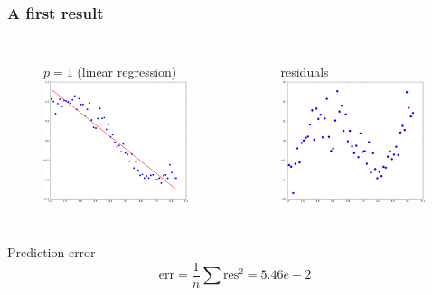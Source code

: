 \documentclass[handout, 10pt]{beamer}
\begin{document}
\begin{frame}
\frametitle{A first result}
\vspace{-2em}
\begin{columns}[t]
\begin{figure}
$p=1$ (linear regression)\\
\includegraphics[width=0.99\textwidth]{./linreg_pow1.png}
\end{figure}
\begin{figure}
residuals\\
\includegraphics[width=0.99\textwidth]{./residuals.png}
\end{figure}

\end{columns}
\begin{block}{Prediction error}
$$
\text{err} = \frac{1}{n}\sum \text{res}^2 = 5.46e-2
$$
\end{block}

\end{frame}
\end{document}
